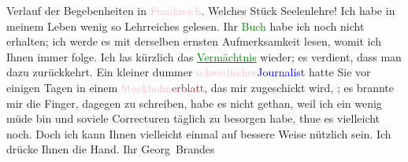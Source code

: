                     Verlauf der Begebenheiten in \textcolor{pink}{Frankreich}{}\ledrightnote{\textcolor{pink}{Frankreich}}.
                    Welches Stück Seelenlehre! Ich habe in meinem {\pb}Leben wenig so Lehrreiches
                    gelesen.\pend
           \pstart
           Ihr \textcolor{green}{Buch}{} habe ich noch nicht
                    erhalten; ich werde es mit derselben ernsten Aufmerksamkeit lesen, womit ich
                    Ihnen immer folge. Ich las kürzlich das \textcolor{green}{\uline{Vermächtnis}}{}\ledrightnote{\textcolor{green}{Das Vermächtnis. Schauspiel in drei Akten}} wieder; es verdient, dass
                    man dazu zurückkehrt. Ein kleiner dummer \textcolor{pink}{schwedischer}{}\ledrightnote{\textcolor{pink}{Schweden}}{ }\textcolor{blue}{Journalist}{} hatte Sie vor
                    einigen Tagen in einem \textcolor{brown}{\textcolor{pink}{Stockholm}{}\ledrightnote{\textcolor{pink}{Stockholm}}erblatt}{}, das mir zugeschickt
                    wird, \label{K_L00916_1v}\label{K_L00916_1h}; es brannte mir die Finger, dagegen zu schreiben,
                    habe es nicht gethan, weil ich ein wenig müde bin und soviele Correcturen
                    täglich zu besorgen habe, thue es vielleicht noch. Doch ich kann Ihnen
                    vielleicht einmal auf bessere Weise nützlich sein.\pend
           \pstart
           Ich drücke Ihnen die Hand.\pend
           \pstart Ihr \spacefill\mbox{Georg Brandes}\pend{}\endnumbering{}  
      